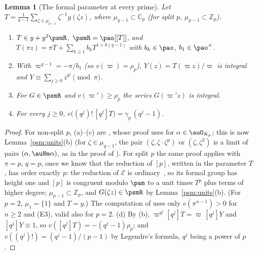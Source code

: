 \documentclass[10pt]{amsart}
\newtheorem{lemma}[theorem]{Lemma}
\theoremstyle{definition}
\theoremstyle{remark}
\newcommand{\C}{\mathbb C}
\newcommand{\Z}{\mathbb Z}
\begin{document}
\begin{lemma}[The formal parameter at every prime]\label{psm:param}
Let $T=\frac1{q-1}\sum_{\zeta\in\mu_{q-1}}\zeta^{-1}y(\zeta z)$, where $\mu_{q-1}\subset\C_p$
\textup{(}for split $p$, $\mu_{p-1}\subset\Z_p$\textup{)}.
\begin{enumerate}
\item[(a)] $T\in y+y^2\psmR$, $\psmR=\pao[[T]]$, and $T(\pi z)=\pi T+\sum_{k\ge1}b_kT^{1+k(q-1)}$
with $b_k\in\pao$, $b_1\in\pao^\times$.
\item[(b)] With $\varpi^{q-1}=-\pi/b_1$ \textup{(}so $v(\varpi)=\rho_p$\textup{)}, $Y(z)=T(\varpi z)/
\varpi$ is integral and $Y\equiv\sum_{j\ge0}z^{q^j}\pmod{\pi}$.
\item[(c)] For $G\in\psmR$ and $v(\varpi')\ge\rho_p$ the series $G(\varpi'z)$ is integral.
\item[(d)] For every $j\ge0$, $v\bigl((q^j)!\,[q^j]T\bigr)=\gamma_p\,(q^j-1)$.
\end{enumerate}
\end{lemma}
\begin{proof}
For non-split $p$, (a)--(c) are {\cite[Lemma~4.6]{P49}}, whose proof uses {\cite[(26)]{P49}} for
$\alpha\in\auO_{K_p}$; this is now Lemma~\ref{psm:units}(b) (for $\zeta\in\mu_{q-1}$, the pair
$(\zeta,\zeta\cdot\zeta^{p})$ or $(\zeta,\zeta^2)$ is a limit of pairs $(\alpha,\auNm\alpha)$, as
in the proof of {\cite[Lemma~4.7(b)]{P49}}). For split $p$ the same proof applies with $\pi=p$, $q=p$,
once we know that the reduction of $[p]$, written in the parameter $T$, has order exactly $p$: the
reduction of $\mathcal E$ is ordinary~\cite[Chapter~13, Theorem~12]{LangEF}, so its formal group has
height one and $[p]$ is congruent modulo $\pam$ to a unit times $T^p$ plus terms of higher degree;
$\mu_{p-1}\subset\Z_p$, and $G(\zeta z)\in\psmR$ by Lemma~\ref{psm:units}(b). (For $p=2$, $\mu_1=\{1\}$
and $T=y$.) The computation of {\cite[Lemma~4.6(b)]{P49}} uses only $v(\pi^{n-1})>0$ for $n\ge2$ and
(E3), valid also for $p=2$. (d) By (b), $\varpi^{q^j}[q^j]T=\varpi\,[q^j]Y$ and $[q^j]Y\equiv1$, so
$v([q^j]T)=-(q^j-1)\rho_p$; and $v((q^j)!)=(q^j-1)/(p-1)$ by Legendre's formula, $q^j$ being a power
of $p$.
\end{proof}
\end{document}
